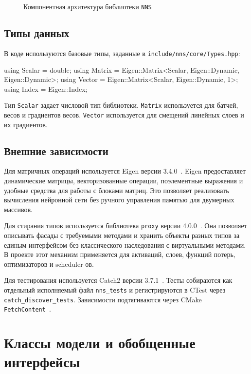 \documentclass{article}
\begin{document}
\begin{figure}[!t]
    \centering
    
    \caption{Компонентная архитектура библиотеки \texttt{NNS}}
    \label{fig:components}
\end{figure}

\subsection{Типы данных}
В коде используются базовые типы, заданные в
\texttt{include/nns/core/Types.hpp}:
\begin{cppcode}
using Scalar = double;
using Matrix = Eigen::Matrix<Scalar, Eigen::Dynamic, Eigen::Dynamic>;
using Vector = Eigen::Matrix<Scalar, Eigen::Dynamic, 1>;
using Index = Eigen::Index;
\end{cppcode}
Тип \texttt{Scalar} задает числовой тип библиотеки.
\texttt{Matrix} используется для батчей, весов и градиентов весов.
\texttt{Vector} используется для смещений линейных слоев и их
градиентов.
\subsection{Внешние зависимости}

Для матричных операций используется Eigen версии
3.4.0~\cite{eigenweb}. Eigen предоставляет динамические матрицы,
векторизованные операции, поэлементные выражения и удобные средства
для работы с блоками матриц. Это позволяет реализовать вычисления
нейронной сети без ручного управления памятью для двумерных массивов.

Для стирания типов используется библиотека \texttt{proxy} версии
4.0.0~\cite{proxygithub}. Она позволяет описывать фасады с требуемыми
методами и хранить объекты разных типов за единым
интерфейсом без классического наследования с виртуальными методами.
В проекте этот механизм применяется для активаций, слоев, функций
потерь, оптимизаторов и scheduler-ов.

Для тестирования используется Catch2 версии 3.7.1~\cite{catch2github}.
Тесты собираются как отдельный исполняемый файл \texttt{nns\_tests} и
регистрируются в CTest через \texttt{catch\_discover\_tests}.
Зависимости подтягиваются через CMake
\texttt{FetchContent}~\cite{cmakefetchcontent}.


\section{Классы модели и обобщенные интерфейсы}
\end{document}
